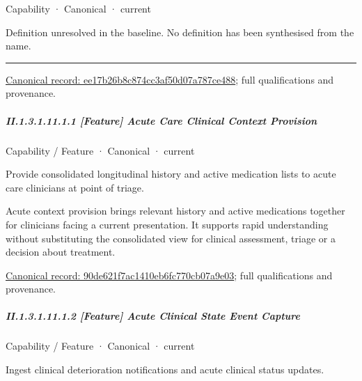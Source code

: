 \label{element:ee17b26b8c874cc3af50d07a787ce488}
{\small Capability · Canonical · current}\par

Definition unresolved in the baseline. No definition has been synthesised from the name.



\medskip\hrule\medskip

{\footnotesize \href{../../../../continuum/strategy/capability/ee17b26b8c874cc3af50d07a787ce488.md}{Canonical record: ee17b26b8c874cc3af50d07a787ce488}; full qualifications and provenance.}\par
\subparagraph*{II.1.3.1.11.1.1 [Feature] Acute Care Clinical Context Provision}
\label{navigation:II.1.3.1.11.1.1}

\label{element:90de621f7ac1410eb6fc770cb07a9e03}
{\small Capability / Feature · Canonical · current}\par

Provide consolidated longitudinal history and active medication lists to acute care clinicians at point of triage.



Acute context provision brings relevant history and active medications together for clinicians facing a current presentation. It supports rapid understanding without substituting the consolidated view for clinical assessment, triage or a decision about treatment.


{\footnotesize \href{../../../../continuum/strategy/capability/feature/90de621f7ac1410eb6fc770cb07a9e03.md}{Canonical record: 90de621f7ac1410eb6fc770cb07a9e03}; full qualifications and provenance.}\par
\subparagraph*{II.1.3.1.11.1.2 [Feature] Acute Clinical State Event Capture}
\label{navigation:II.1.3.1.11.1.2}

\label{element:566f6934c9b04627b0876f91bedd8f30}
{\small Capability / Feature · Canonical · current}\par

Ingest clinical deterioration notifications and acute clinical status updates.



